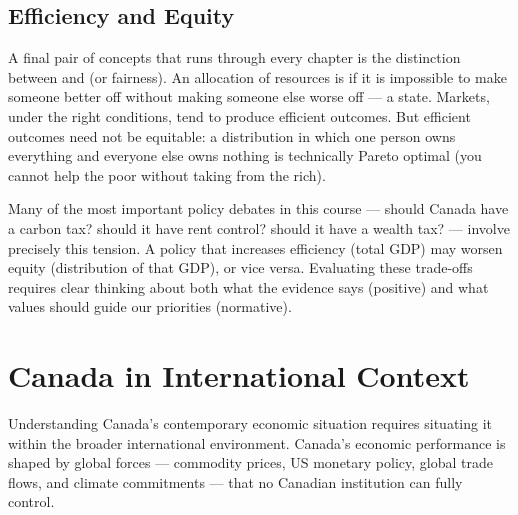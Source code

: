 \subsection{Efficiency and Equity}

A final pair of concepts that runs through every chapter is the distinction
between  and  (or fairness).
An allocation of resources is  if it is impossible to make
someone better off without making someone else worse off --- a
 state. Markets, under the right conditions, tend to
produce efficient outcomes. But efficient outcomes need not be equitable:
a distribution in which one person owns everything and everyone else
owns nothing is technically Pareto optimal (you cannot help the poor
without taking from the rich).

Many of the most important policy debates in this course --- should Canada
have a carbon tax? should it have rent control? should it have a wealth tax?
--- involve precisely this tension. A policy that increases efficiency
(total GDP) may worsen equity (distribution of that GDP), or vice versa.
Evaluating these trade-offs requires clear thinking about both what the
evidence says (positive) and what values should guide our priorities
(normative).

\section{Canada in International Context}
\label{sec:international_context}

Understanding Canada's contemporary economic situation requires situating
it within the broader international environment. Canada's economic performance
is shaped by global forces --- commodity prices, US monetary policy, global
trade flows, and climate commitments --- that no Canadian institution can
fully control.

